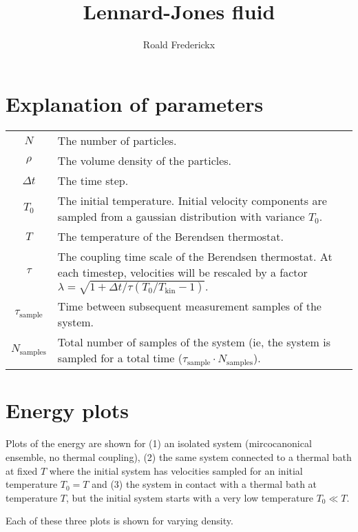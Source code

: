 \documentclass[11pt,a4paper]{article}
\begin{document}
\author{Roald Frederickx}
\title{Lennard-Jones fluid}
\date{}
\maketitle

\section{Explanation of parameters}
\begin{center}
\begin{tabularx}{\linewidth}{c | X}
$N$&	The number of particles.\\[5pt]
$\rho$&	The volume density of the particles.\\[5pt]
$\Delta t$&	The time step.\\[5pt]
$T_0$&		The initial temperature. Initial velocity components are sampled from a gaussian distribution with variance $T_0$.\\[5pt]
$T$&		The temperature of the Berendsen thermostat.\\[5pt]
$\tau$&		The coupling time scale of the Berendsen thermostat. At each timestep, velocities will be rescaled by a factor $\lambda = \sqrt{1 + \Delta t/\tau\left(T_0/T_{\mathrm{kin}} - 1\right)}.$\\[5pt]
$\tau_{\mathrm{sample}}$&	Time between subsequent measurement samples of the system.\\[5pt]
$N_{\mathrm{samples}}$&		Total number of samples of the system (ie, the system is sampled for a total time ($\tau_\mathrm{sample} \cdot N_\mathrm{samples}$).\\
\end{tabularx}
\end{center}

\section{Energy plots}
Plots of the energy are shown for (1) an isolated system (mircocanonical ensemble, no thermal coupling), (2) the same system connected to a thermal bath at fixed $T$ where the initial system has velocities sampled for an initial temperature $T_0 = T$ and (3) the system in contact with a thermal bath at temperature $T$, but the initial system starts with a very low temperature $T_0 \ll T$.

Each of these three plots is shown for varying density.
\end{document}
